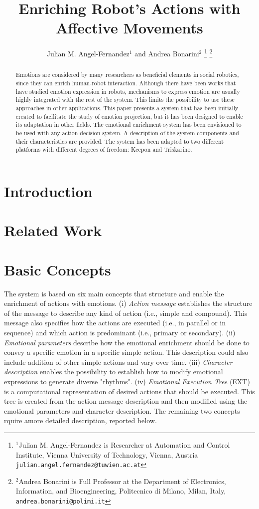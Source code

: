 \documentclass[letterpaper, 10 pt, conference]{ieeeconf}  %
\title{\LARGE \bf
Enriching Robot's Actions with Affective Movements
}
\author{Julian M. Angel-Fernandez$^{1}$ and Andrea Bonarini$^{2}$%
\thanks{$^{1}$Julian M. Angel-Fernandez is Researcher at Automation and Control Institute, Vienna University of Technology, Vienna, Austria
        {\tt\small julian.angel.fernandez@tuwien.ac.at}}%
\thanks{$^{2}$Andrea Bonarini is Full Professor at the Department of Electronics, Information, and Bioengineering, Politecnico di Milano, Milan, Italy,
        {\tt\small andrea.bonarini@polimi.it}}%
}
\begin{document}
\maketitle
\thispagestyle{empty}
\pagestyle{empty}


\begin{abstract}
Emotions are considered by many researchers as beneficial elements in social robotics, since they can enrich human-robot interaction. Although there have been works that have studied emotion expression in robots, mechanisms to express emotion are usually highly integrated with the rest of the system. This limits the possibility to use these approaches in other applications. This paper presents a system that has been initially created to facilitate the study of emotion projection, but it has been designed to enable its adaptation in other fields. The emotional enrichment system has been envisioned to be used with any action decision system. A description of the system components and their characteristics are provided. The system has been adapted to two different platforms with different degrees of freedom: Keepon and Triskarino. 
\end{abstract}

\section{Introduction}

\section{Related Work}
\label{sec:related_work}

\section{Basic Concepts}
\label{sec:concepts}
The system is based on six main concepts that structure and enable the enrichment of actions with emotions. (i) \textit{Action message} establishes the structure of the message to describe any kind of action (i.e., simple and compound). This message also specifies how the actions are executed (i.e., in parallel or in sequence) and which action is predominant (i.e., primary or secondary). (ii) \textit{Emotional parameters} describe how the emotional enrichment should be done to convey a specific emotion in a specific simple action. This description could also include addition of other simple actions and vary over time. (iii) \textit{Character description} enables the possibility to establish how to modify emotional expressions to generate diverse "rhythms". (iv) \textit{Emotional Execution Tree} (EXT) is a computational representation of desired actions that should be executed. This tree is created from the action message description and then modified using the emotional parameters and character description. The remaining two concepts rquire amore detailed description, reported below.
\end{document}
